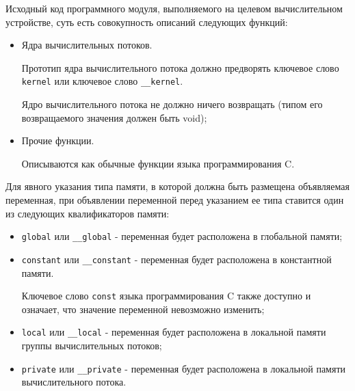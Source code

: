 

		Исходный код программного модуля, выполняемого на целевом вычислительном устройстве, суть есть совокупность описаний следующих функций:

		\begin{itemize}

			\item Ядра вычислительных потоков.

				Прототип ядра вычислительного потока должно предворять ключевое слово \verb|kernel| или ключевое слово \verb|__kernel|.

				Ядро вычислительного потока не должно ничего возвращать (типом его возвращаемого значения должен быть void);

			\item Прочие функции.

				Описываются как обычные функции языка программирования C.

		\end{itemize}


		Для явного указания типа памяти, в которой должна быть размещена объявляемая переменная, при объявлении переменной перед указанием ее типа ставится один из следующих квалификаторов памяти:

		\begin{itemize}

			\item \verb|global| или \verb|__global| - переменная будет расположена в глобальной памяти;
			\item \verb|constant| или \verb|__constant| - переменная будет расположена в константной памяти.

			Ключевое слово \verb|const| языка программирования C также доступно и означает, что значение переменной невозможно изменить;

			\item \verb|local| или \verb|__local| - переменная будет расположена в локальной памяти группы вычислительных потоков;
			\item \verb|private| или \verb|__private| - переменная будет расположена в локальной памяти вычислительного потока.

		\end{itemize}

